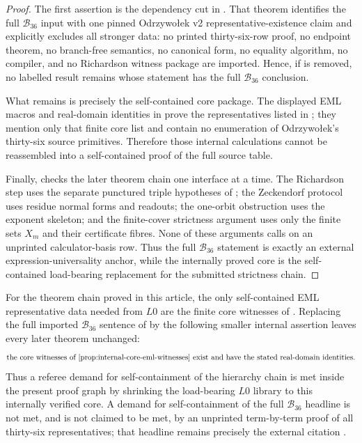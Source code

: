 \begin{proof}
The first assertion is the dependency cut in
.  That theorem identifies the full
\(\mathcal B_{36}\) input with one pinned Odrzywo{\l}ek v2 representative-existence
claim and explicitly excludes all stronger data: no printed thirty-six-row proof,
no endpoint theorem, no branch-free semantics, no canonical form, no equality
algorithm, no compiler, and no Richardson witness package are imported.  Hence,
if  is removed, no labelled result remains whose
statement has the full \(\mathcal B_{36}\) conclusion.

What remains is precisely the self-contained core package.  The displayed EML
macros and real-domain identities in
 prove the representatives
listed in ; they mention only that finite
core list and contain no enumeration of Odrzywo{\l}ek's thirty-six source
primitives.  Therefore those internal calculations cannot be reassembled into a
self-contained proof of the full source table.

Finally,  checks the later theorem
chain one interface at a time.  The Richardson step uses the separate punctured
triple hypotheses of ; the Zeckendorf protocol uses residue
normal forms and readouts; the one-orbit obstruction uses the exponent skeleton;
and the finite-cover strictness argument uses only the finite sets \(X_m\) and
their certificate fibres.  None of these arguments calls on an unprinted
calculator-basis row.  Thus the full \(\mathcal B_{36}\) statement is exactly an
external expression-universality anchor, while the internally proved core is the
self-contained load-bearing replacement for the submitted strictness chain.
\end{proof}

\begin{theorem}
\label{thm:B36-self-contained-replacement-core}
For the theorem chain proved in this article, the only self-contained EML
representative data needed from \(L0\) are the finite core witnesses of
.  Replacing the full imported
\(\mathcal B_{36}\) sentence of  by the following
smaller internal assertion leaves every later theorem unchanged:
\[
\text{the core witnesses of \Cref{prop:internal-core-eml-witnesses} exist and
have the stated real-domain identities.}
\]
Thus a referee demand for self-containment of the hierarchy chain is met inside
the present proof graph by shrinking the load-bearing \(L0\) library to this
internally verified core.  A demand for self-containment of the full
\(\mathcal B_{36}\) headline is not met, and is not claimed to be met, by an
unprinted term-by-term proof of all thirty-six representatives; that headline
remains precisely the external citation .
\end{theorem}

